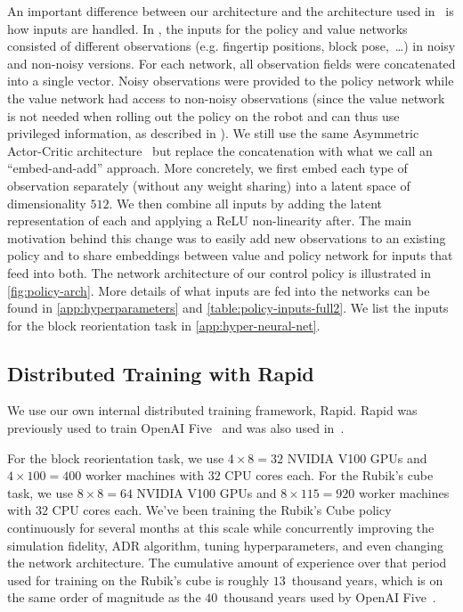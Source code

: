 An important difference between our architecture and the architecture used in~\citep{openai2018learning} is how inputs are handled. In \citep{openai2018learning}, the inputs for the policy and value networks consisted of different observations (e.g. fingertip positions, block pose,~\ldots) in noisy and non-noisy versions. For each network, all observation fields were concatenated into a single vector. Noisy observations were provided to the policy network while the value network had access to non-noisy observations (since the value network is not needed when rolling out the policy on the robot and can thus use privileged information, as described in \citep{pinto2017asymmetric}). We still use the same Asymmetric Actor-Critic architecture~\citep{pinto2017asymmetric} but replace the concatenation with what we call an ``embed-and-add'' approach. More concretely, we first embed each type of observation separately (without any weight sharing) into a latent space of dimensionality $512$. We then combine all inputs by adding the latent representation of each and applying a ReLU non-linearity after.
The main motivation behind this change was to easily add new observations to an existing policy and to share embeddings between value and policy network for inputs that feed into both. The network architecture of our control policy is illustrated in \autoref{fig:policy-arch}. More details of what inputs are fed into the networks can be found in \autoref{app:hyperparameters} and \autoref{table:policy-inputs-full2}. We list the inputs for the block reorientation task in \autoref{app:hyper-neural-net}.


\subsection{Distributed Training with Rapid}
We use our own internal distributed training framework, Rapid. Rapid was previously used to train OpenAI Five~\citep{five} and was also used in~\cite{openai2018learning}.

For the block reorientation task, we use $4 \times 8 = 32$ NVIDIA V100 GPUs and $4 \times 100 = 400$ worker machines with $32$ CPU cores each. For the Rubik's cube task, we use $8\times8=64$ NVIDIA V100 GPUs and $8\times115 = 920$ worker machines with $32$ CPU cores each. We've been training the Rubik's Cube policy continuously for several months  at this scale while concurrently improving the simulation fidelity, ADR algorithm, tuning hyperparameters, and even changing the network architecture. The cumulative amount of experience over that period used for training on the Rubik's cube is roughly $13$~thousand years, which is on the same order of magnitude as the $40$~thousand years used by OpenAI Five~\cite{five}.

